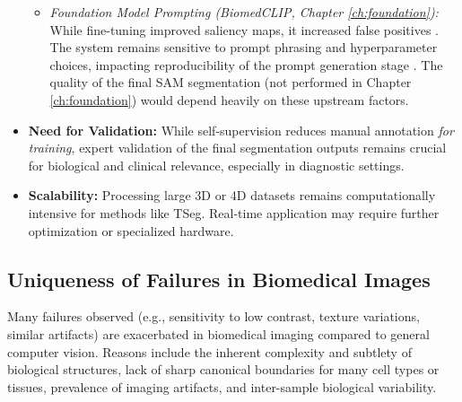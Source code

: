 \documentclass[./dissertation.tex]{subfiles}
\begin{document}
\begin{itemize}
\begin{itemize}
              \item \textit{Foundation Model Prompting (BiomedCLIP, Chapter \ref{ch:foundation}):} While fine-tuning improved saliency maps, it increased false positives \cite{dissertation.pdf}. The system remains sensitive to prompt phrasing and hyperparameter choices, impacting reproducibility of the prompt generation stage \cite{dissertation.pdf}. The quality of the final SAM segmentation (not performed in Chapter \ref{ch:foundation}) would depend heavily on these upstream factors.
          \end{itemize}
    \item \textbf{Need for Validation:} While self-supervision reduces manual annotation \textit{for training}, expert validation of the final segmentation outputs remains crucial for biological and clinical relevance, especially in diagnostic settings.
    \item \textbf{Scalability:} Processing large 3D or 4D datasets remains computationally intensive for methods like TSeg. Real-time application may require further optimization or specialized hardware.
\end{itemize}

\subsection*{Uniqueness of Failures in Biomedical Images}
Many failures observed (e.g., sensitivity to low contrast, texture variations, similar artifacts) are exacerbated in biomedical imaging compared to general computer vision. Reasons include the inherent complexity and subtlety of biological structures, lack of sharp canonical boundaries for many cell types or tissues, prevalence of imaging artifacts, and inter-sample biological variability.
\end{document}
